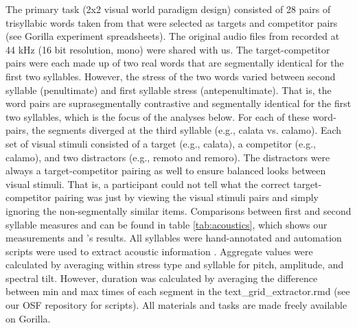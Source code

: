 The primary task (2x2 visual world paradigm design) consisted of 28 pairs of trisyllabic words taken from \cite{Sulpizio_McQueen_2012} that were selected as targets and competitor pairs (see Gorilla experiment spreadsheets). The original audio files from \cite{Sulpizio_McQueen_2012}recorded at 44 kHz (16 bit resolution, mono) were shared with us. The target-competitor pairs were each made up of two real words that are segmentally identical for the first two syllables. However, the stress of the two words varied between second syllable (penultimate) and first syllable stress (antepenultimate). That is, the word pairs are suprasegmentally contrastive and segmentally identical for the first two syllables, which is the focus of the analyses below. For each of these word-pairs, the segments diverged at the third syllable (e.g., calata vs. calamo). Each set of visual stimuli consisted of a target (e.g., calata), a competitor (e.g., calamo), and two distractors (e.g., remoto and remoro). The distractors were always a target-competitor pairing as well to ensure balanced looks between visual stimuli. That is, a participant could not tell what the correct target-competitor pairing was just by viewing the visual stimuli pairs and simply ignoring the non-segmentally similar items. Comparisons between first and second syllable measures and can be found in table \ref{tab:acoustics}, which shows our measurements and \cite{Sulpizio_McQueen_2012}'s results. All syllables were hand-annotated and automation scripts were used to extract acoustic information \citep{qi_textgrid_maker, dicanio_vowel_acoustics}. Aggregate values were calculated by averaging within stress type and syllable for pitch, amplitude, and spectral tilt. However, duration was calculated by averaging the difference between min and max times of each segment in the text\_grid\_extractor.rmd (see our OSF repository for scripts). All materials and tasks are made freely available on Gorilla. 


